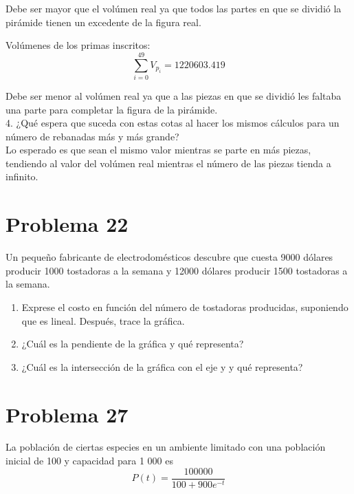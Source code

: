 \documentclass[12pt]{article}
\begin{document}
Debe ser mayor que el volúmen real ya que todos las partes en que se dividió la pirámide tienen un excedente de la figura real.

Volúmenes de los primas inscritos:
\[
\sum_{i=0}^{49} V_{p_i} = 1220603.419      
\]

Debe ser menor al volúmen real ya que a las piezas en que se dividió les faltaba una parte para completar la figura de la pirámide.
\\
4. ¿Qué espera que suceda con estas cotas al hacer los mismos cálculos para un número de
rebanadas más y más grande?
\\
Lo esperado es que sean el mismo valor mientras se parte en más piezas, tendiendo al valor del volúmen real mientras el número de las piezas tienda a infinito.
\clearpage
\section{Problema 22}
Un pequeño fabricante de electrodomésticos descubre que
cuesta 9000 dólares producir 1000 tostadoras a la semana y 12000 dólares producir 1500 tostadoras a la semana.
\begin{enumerate}
\item Exprese el costo en función del número de tostadoras
producidas, suponiendo que es lineal. Después, trace
la gráfica.
\item  ¿Cuál es la pendiente de la gráfica y qué representa?
\item  ¿Cuál es la intersección de la gráfica con el eje y y qué representa?
\end{enumerate}

\clearpage
\section{Problema 27}
La población de ciertas especies en un ambiente limitado con una población inicial de 100 y capacidad para 1 000 es 
\[
P (t) = \frac{100 000}{100 + 900 e^{-t}} 
\]
\end{document}
